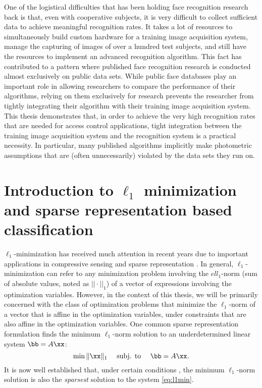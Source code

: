 One of the logistical difficulties that has been holding face recognition
research back is that, even with cooperative subjects, it is very difficult to
collect sufficient data to achieve meaningful recognition rates.  It takes a
lot of resources to simultaneously build custom hardware for a training image
acquisition system, manage the capturing of images of over a hundred test
subjects, and still have the resources to implement an advanced recognition
algorithm.  This fact has contributed to a pattern where published face
recognition research is conducted almost exclusively on public data sets.
While public face databases play an important role in allowing researchers to
compare the performance of their algorithms, relying on them exclusively for
research prevents the researcher from tightly integrating their algorithm with
their training image acquisition system.  This thesis demonstrates that, in
order to achieve the very high recognition rates that are needed for access
control applications, tight integration between the training image acquisition
system and the recognition system is a practical necessity.  In particular,
many published algorithms implicitly make photometric assumptions that are
(often unnecessarily) violated by the data sets they run on.  

\section{Introduction to $\ell_1$ minimization and sparse representation based classification}
%
$\ell_1$-minimization has received much attention in recent years due to
important applications in compressive sensing \cite{BrucksteinA2007} and sparse
representation \cite{WrightJ2010-PIEEE}.  
In general, $\ell_1$-minimization can refer to any minimization problem involving the 
$ell_1$-norm (sum of absolute values, noted as $||\cdot||_1$) of a vector of expressions involving the optimization
variables. However, in the context of this thesis, we will be primarily concerned with
the class of optimization problems that minimize the $\ell_1$-norm of a vector that
is affine in the optimization variables, under constraints that are also affine in the optimization variables.
One common sparse representation formulation finds the minimum $\ell_1$-norm solution to an
underdetermined linear system $\bb=A\xx$:
%
\begin{equation} \min \|\xx\|_1\quad \mbox{ subj. to }\quad \bb = A\xx.
\label{eq:l1min} \end{equation}
%
It is now well established that, under certain conditions
\cite{CandesE2005-IT_1,DonohoD2004}, the minimum $\ell_1$-norm solution is also
the \emph{sparsest} solution to the system \eqref{eq:l1min}.

